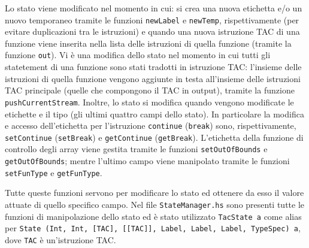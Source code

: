 Lo stato viene modificato nel momento in cui: si crea una nuova etichetta e/o un nuovo temporaneo tramite le funzioni {\tt newLabel} e {\tt newTemp}, rispettivamente (per evitare duplicazioni tra le istruzioni) e quando una nuova istruzione TAC di una funzione viene inserita nella lista delle istruzioni di quella funzione (tramite la funzione {\tt out}). Vi è una modifica dello stato nel momento in cui tutti gli statetement di una funzione sono stati tradotti in istruzione TAC: l'insieme delle istruzioni di quella funzione vengono aggiunte in testa all'insieme delle istruzioni TAC principale (quelle che compongono il TAC in output), tramite la funzione {\tt pushCurrentStream}.
Inoltre, lo stato si modifica quando vengono modificate le etichette e il tipo (gli ultimi quattro campi dello stato). In particolare la modifica e accesso dell'etichetta per l'istruzione {\tt continue} ({\tt break}) sono, rispettivamente, {\tt setContinue} ({\tt setBreak}) e {\tt getContinue} ({\tt getBreak}). L'etichetta della funzione di controllo degli array viene gestita tramite le funzioni {\tt setOutOfBounds} e {\tt getOutOfBounds}; mentre l'ultimo campo viene manipolato tramite le funzioni {\tt setFunType} e {\tt getFunType}.

Tutte queste funzioni servono per modificare lo stato ed ottenere da esso il valore attuate di quello specifico campo.
Nel file {\tt StateManager.hs} sono presenti tutte le funzioni di manipolazione dello stato ed è stato utilizzato {\tt TacState a} come alias per {\tt State (Int, Int, [TAC], [[TAC]], Label, Label, Label, TypeSpec) a}, dove {\tt TAC} è un'istruzione TAC.